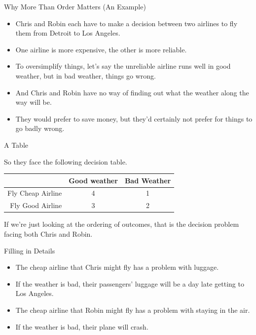 \documentclass[
  ignorenonframetext,
]{beamer}
\providecommand{\tightlist}{%
  \setlength{\itemsep}{0pt}\setlength{\parskip}{0pt}}
\renewcommand{\,}{\text{, }}
\begin{document}
\begin{frame}{Why More Than Order Matters (An Example)}
\protect\hypertarget{why-more-than-order-matters-an-example}{}

\begin{itemize}
\tightlist
\item
  Chris and Robin each have to make a decision between two airlines to
  fly them from Detroit to Los Angeles.
\item
  One airline is more expensive, the other is more reliable.
\item
  To oversimplify things, let's say the unreliable airline runs well in
  good weather, but in bad weather, things go wrong.
\item
  And Chris and Robin have no way of finding out what the weather along
  the way will be.
\item
  They would prefer to save money, but they'd certainly not prefer for
  things to go badly wrong.
\end{itemize}

\end{frame}

\begin{frame}{A Table}
\protect\hypertarget{a-table-5}{}

So they face the following decision table.

\begin{longtable}[]{@{}rcc@{}}
\toprule
& Good weather & Bad Weather\tabularnewline
\midrule
\endhead
Fly Cheap Airline & 4 & 1\tabularnewline
Fly Good Airline & 3 & 2\tabularnewline
\bottomrule
\end{longtable}

If we're just looking at the ordering of outcomes, that is the decision
problem facing both Chris and Robin.

\end{frame}

\begin{frame}{Filling in Details}
\protect\hypertarget{filling-in-details}{}

\begin{itemize}
\tightlist
\item
  The cheap airline that Chris might fly has a problem with luggage.
\item
  If the weather is bad, their passengers' luggage will be a day late
  getting to Los Angeles. \pause 
\item
  The cheap airline that Robin might fly has a problem with staying in
  the air.
\item
  If the weather is bad, their plane will crash.
\end{itemize}

\end{frame}
\end{document}
